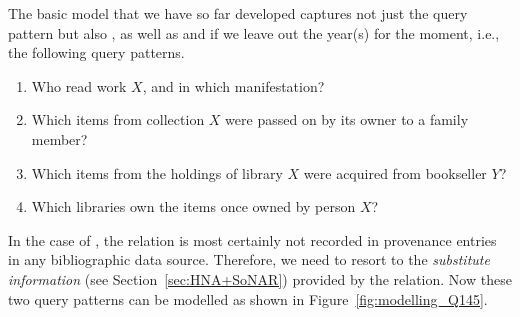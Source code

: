 The basic model that we have so far developed captures not just the query pattern 
but also , as well as  and  if we leave out the year(s) for the moment, i.e.,
the following query patterns.
%
\begin{enumerate}
  \item[\exaquery{1$^-$}]
    Who read
    work $X$, and
    in which manifestation?
  \item[\exaquery{4\phantom{$^-$}}]
    Which items from collection $X$ were passed on by its owner to a family member?
  \item[\exaquery{5$^-$}]
    Which items from the holdings of library $X$ were acquired from bookseller $Y$?
  \item[\exaquery{8}\phantom{$^-$}]
    Which libraries own the items once owned by person $X$?
\end{enumerate}
%
In the case of , the relation  is most certainly not recorded in provenance entries
in any bibliographic data source. Therefore, we need to resort to the \emph{substitute information}
(see Section~\ref{sec:HNA+SoNAR}) provided by the  relation.
Now these two query patterns
can be modelled as shown in Figure~\ref{fig:modelling_Q145}.

